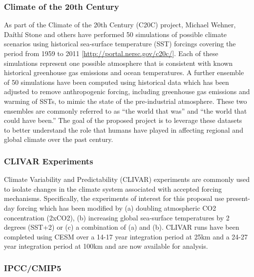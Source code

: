 \documentclass[11pt]{article}
\begin{document}


\subsubsection{Climate of the 20th Century} \label{sec:EnsembleData}

As part of the Climate of the 20th Century (C20C) project, Michael Wehner, Da\'ith\'i Stone and others have performed 50 simulations of possible climate scenarios using historical sea-surface temperature (SST) forcings covering the period from 1959 to 2011 [\url{http://portal.nersc.gov/c20c/}].  Each of these simulations represent one possible atmosphere that is consistent with known historical greenhouse gas emissions and ocean temperatures.  A further ensemble of 50 simulations have been computed using historical data which has been adjusted to remove anthropogenic forcing, including greenhouse gas emissions and warming of SSTs, to mimic the state of the pre-industrial atmosphere.  These two ensembles are commonly referred to as ``the world that was'' and ``the world that could have been.''  The goal of the proposed project is to leverage these datasets to better understand the role that humans have played in affecting regional and global climate over the past century.

\subsubsection{CLIVAR Experiments} \label{sec:CLIVAR}

Climate Variability and Predictability (CLIVAR) experiments are commonly used to isolate changes in the climate system associated with accepted forcing mechanisms.  Specifically, the experiments of interest for this proposal use present-day forcing which has been modified by (a) doubling atmospheric CO2 concentration (2xCO2), (b) increasing global sea-surface temperatures by 2 degrees (SST+2) or (c) a combination of (a) and (b).  CLIVAR runs have been completed using CESM over a 14-17 year integration period at 25km and a 24-27 year integration period at 100km and are now available for analysis.

\subsubsection{IPCC/CMIP5} \label{sec:IPCC-CMIP5}
\end{document}
